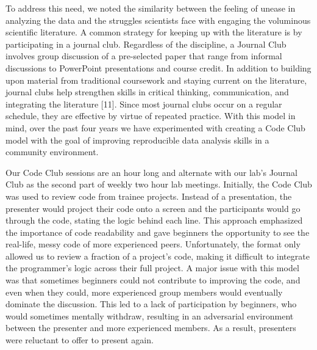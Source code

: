 \documentclass[
  11pt,
]{article}
\begin{document}
To address this need, we noted the similarity between the feeling of
unease in analyzing the data and the struggles scientists face with
engaging the voluminous scientific literature. A common strategy for
keeping up with the literature is by participating in a journal club.
Regardless of the discipline, a Journal Club involves group discussion
of a pre-selected paper that range from informal discussions to
PowerPoint presentations and course credit. In addition to building upon
material from traditional coursework and staying current on the
literature, journal clubs help strengthen skills in critical thinking,
communication, and integrating the literature {[}11{]}. Since most
journal clubs occur on a regular schedule, they are effective by virtue
of repeated practice. With this model in mind, over the past four years
we have experimented with creating a Code Club model with the goal of
improving reproducible data analysis skills in a community environment.

Our Code Club sessions are an hour long and alternate with our lab's
Journal Club as the second part of weekly two hour lab meetings.
Initially, the Code Club was used to review code from trainee projects.
Instead of a presentation, the presenter would project their code onto a
screen and the participants would go through the code, stating the logic
behind each line. This approach emphasized the importance of code
readability and gave beginners the opportunity to see the real-life,
messy code of more experienced peers. Unfortunately, the format only
allowed us to review a fraction of a project's code, making it difficult
to integrate the programmer's logic across their full project. A major
issue with this model was that sometimes beginners could not contribute
to improving the code, and even when they could, more experienced group
members would eventually dominate the discussion. This led to a lack of
participation by beginners, who would sometimes mentally withdraw,
resulting in an adversarial environment between the presenter and more
experienced members. As a result, presenters were reluctant to offer to
present again.
\end{document}
